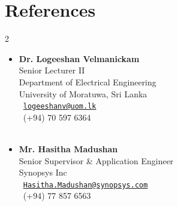 \section{\Large References}
\begin{multicols}{2}
\begin{itemize}[leftmargin=0.15in, label={}]
\small
\item{
\textbf{Dr. Logeeshan Velmanickam}\\
Senior Lecturer II\\
Department of Electrical Engineering\\
University of Moratuwa, Sri Lanka\\
\faEnvelope\ \href{mailto:logeeshanv@uom.lk}{\texttt{logeeshanv@uom.lk}}\\
\faMobile\ (+94) 70 597 6364\\
\faLinkedin\ \href{https://www.linkedin.com/in/logeeshan-velmanickam-ph-d-b6727113b/}{\color{bleudefrance}{LinkedIn Profile}}
}
\end{itemize}

\columnbreak

\begin{itemize}[leftmargin=0.15in, label={}]
\small
\item{
\textbf{Mr. Hasitha Madushan}\\
Senior Supervisor \& Application Engineer\\
Synopsys Inc\\
\faEnvelope\ \href{mailto:Hasitha.Madushan@synopsys.com}{\texttt{Hasitha.Madushan@synopsys.com}}\\
\faMobile\ (+94) 77 857 6563\\
\faLinkedin\ \href{https://www.linkedin.com/in/hasitha-madushan-70456462/}{\color{bleudefrance}{LinkedIn Profile}}
}
\end{itemize}
\end{multicols}